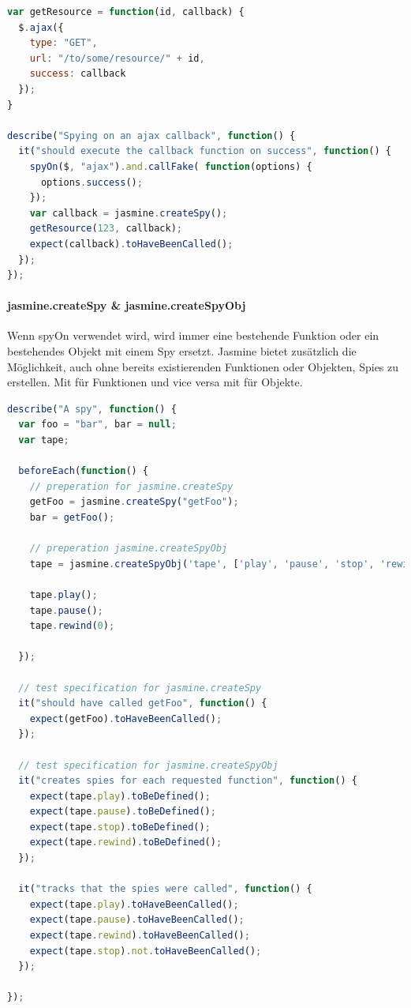 \begin{lstlisting}[language=JavaScript]
var getResource = function(id, callback) {
  $.ajax({
    type: "GET",
    url: "/to/some/resource/" + id,
    success: callback
  });
}

describe("Spying on an ajax callback", function() {
  it("should execute the callback function on success", function() {
    spyOn($, "ajax").and.callFake( function(options) {
      options.success();
    });
    var callback = jasmine.createSpy();
    getResource(123, callback);
    expect(callback).toHaveBeenCalled();
  });
});
\end{lstlisting}

\paragraph{jasmine.createSpy \& jasmine.createSpyObj}
Wenn spyOn verwendet wird, wird immer eine bestehende Funktion oder ein bestehendes Objekt mit einem Spy ersetzt. Jasmine bietet zusätzlich die Möglichkeit, auch ohne bereits existierenden Funktionen oder Objekten, Spies zu erstellen. Mit  für Funktionen und vice versa mit  für Objekte.

\begin{lstlisting}[language=JavaScript]
describe("A spy", function() {
  var foo = "bar", bar = null;
  var tape;

  beforeEach(function() {
    // preperation for jasmine.createSpy
    getFoo = jasmine.createSpy("getFoo");
    bar = getFoo();

    // preperation jasmine.createSpyObj
    tape = jasmine.createSpyObj('tape', ['play', 'pause', 'stop', 'rewind']);

    tape.play();
    tape.pause();
    tape.rewind(0);

  });

  // test specification for jasmine.createSpy
  it("should have called getFoo", function() {
    expect(getFoo).toHaveBeenCalled();
  });

  // test specification for jasmine.createSpyObj
  it("creates spies for each requested function", function() {
    expect(tape.play).toBeDefined();
    expect(tape.pause).toBeDefined();
    expect(tape.stop).toBeDefined();
    expect(tape.rewind).toBeDefined();
  });

  it("tracks that the spies were called", function() {
    expect(tape.play).toHaveBeenCalled();
    expect(tape.pause).toHaveBeenCalled();
    expect(tape.rewind).toHaveBeenCalled();
    expect(tape.stop).not.toHaveBeenCalled();
  });

});
\end{lstlisting}

